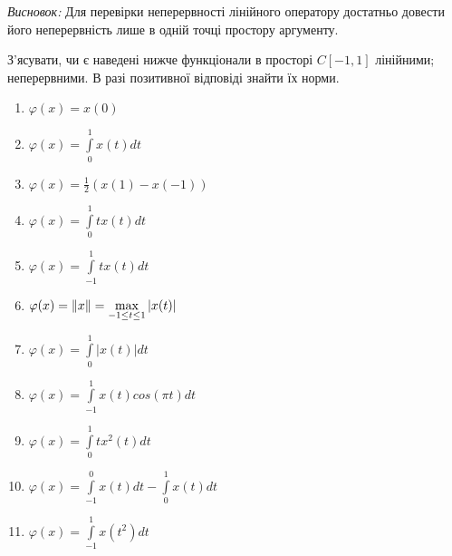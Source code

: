 \begin{theory}
    \emph{Висновок:} Для перевірки неперервності лінійного оператору достатньо 
    довести його неперервність лише в одній точці простору аргументу.
\end{theory}

\begin{exercise}
    З'ясувати, чи є наведені нижче функціонали в просторі $C{\left[-1, 1\right]}$ лінійними; 
    неперервними. В разі позитивної відповіді знайти їх норми. 
    \begin{enumerate}[label=\ukr*)]
        \item $\varphi(x) = x(0)$
        \item $\varphi(x) = \int\limits_0^1x(t)dt$
        \item $\varphi(x) = \frac{1}{2}(x(1) - x(-1))$
        \item $\varphi(x) = \int\limits_0^1tx(t)dt$
        \item $\varphi(x) = \int\limits_{-1}^1tx(t)dt$
        \item $\varphi(x) = \left\lVert x\right\rVert = \max\limits_{-1 \leq t \leq 1} |x(t)|$
        \item $\varphi(x) = \int\limits_0^1|x(t)|dt$
        \item $\varphi(x) = \int\limits_{-1}^1x(t)cos(\pi t)dt$
        \item $\varphi(x) = \int\limits_0^1tx^2(t)dt$
        \item $\varphi(x) = \int\limits_{-1}^0x(t)dt - \int\limits_0^1x(t)dt$
        \item $\varphi(x) = \int\limits_{-1}^1x(t^2)dt$
    \end{enumerate}
\end{exercise}


